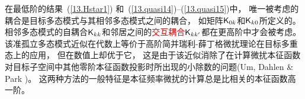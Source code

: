 {{{{\ena

在最低阶的结果~(\ref{13.Hstar1})
和~(\ref{13.quasi14})--(\ref{13.quasi15})中，
唯一被考虑的耦合是目标多态模式与其相邻多态模式之间的耦合，
如矩阵$\mbox{${\sf K}$}_{0k}$和$\mbox{${\sf K}$}_{k0}$所定义的。
相邻多态模式的自耦合$\mbox{${\sf K}$}_{kk}$和邻居之间的\textcolor{red}{交互耦合}$\mbox{${\sf K}$}_{kk'}$都在更高阶中才会被考虑。
该准孤立多态模式近似在代数上等价于高阶简并瑞利-薛丁格微扰理论在目标多重态上的应用，
但在数值上却优于它，
这是由于该近似消除了在计算微扰本征函数对目标子空间中其他零阶本征函数投影时所出现的小除数的问题(Um, Dahlen \& Park \citeyear{um&al91})。
这两种方法的一般特征是本征频率微扰的计算总是比相关的本征函数高一阶。

}}}}
